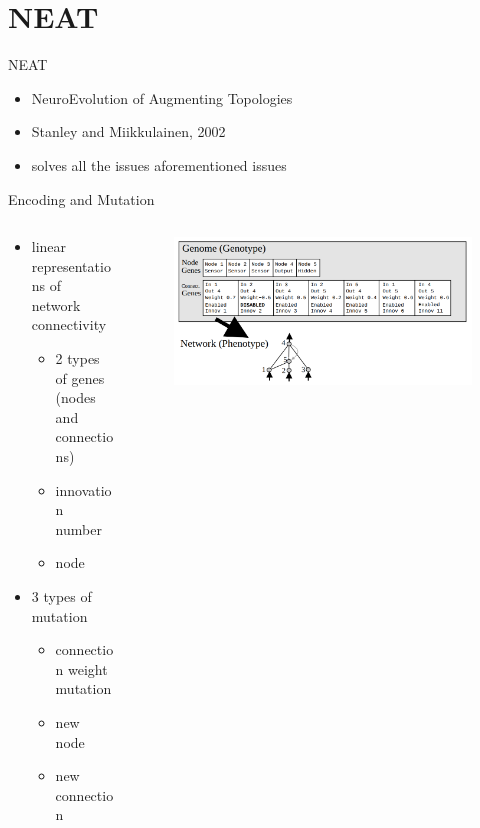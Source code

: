 \documentclass{beamer}
\begin{document}
\section{NEAT}
\begin{frame}{NEAT}
    \begin{itemize}
        \item NeuroEvolution of Augmenting Topologies
        \item Stanley and Miikkulainen, 2002
        \item solves all the issues aforementioned issues
    \end{itemize}
\end{frame}
\begin{frame}{Encoding and Mutation}
    \begin{columns}
        \begin{column}{0.5\textwidth}
            \begin{itemize}
                \item  linear representations of network connectivity
                      \begin{itemize}
                          \item 2 types of genes (nodes and connections)
                          \item innovation number
                          \item node
                      \end{itemize}
                \item 3 types of mutation
                      \begin{itemize}
                          \item connection weight mutation
                          \item new node
                          \item new connection
                      \end{itemize}
            \end{itemize}
        \end{column}
        \begin{column}{0.5\textwidth}
            \begin{figure}[c]
                \includegraphics[width = \textwidth]{img/encoding.png}

\end{figure}
\end{column}
\end{columns}
\end{frame}
\end{document}
